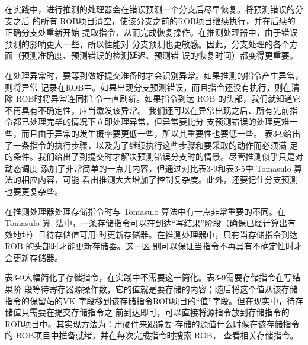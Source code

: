 在实践中，进行推测的处理器会在错误预测一个分支后尽早恢复。将预测错误的分支之后
的所有 ROB项目清空，使该分支之前的ROB项目继续执行，并在后续的正确分支处重新开始
提取指令，从而完成恢复操作。在推测处理器中，由于错误预测的影响更大一些，所以性能对
分支预测也更敏感。因此，分支处理的各个方面（预测准确度、预测错误的检测延迟、预测错
误的恢复时间）都变得更重要。

在处理异常时，要等到做好提交准备时才会识别异常。如果推测的指令产生异常，则将异常
记录在ROB中。如果出现分支预测错误，而且指令还没有执行，则在清除 ROB时将异常连同指
令一直刷新。如果指令到达 ROB 的头部，我们就知道它不再具有不确定性，应当激发该异常。
我们还可以在异常出现之后、所有先前指令都已处理完毕的情况下立即处理异常，但异常要比分
支预测错误的处理更难一些，而且由于异常的发生概率要更低一些，所以其重要性也要低一些。
表3-9给出了一条指令的执行步骤，以及为了继续执行这些步骤和要采取的动作而必须满
足的条件。我们给出了到提交时才解决预测错误分支时的情景。尽管推测似乎只是对动态调度
添加了非常简单的一点儿内容，但通过对比表3-9和表3-5中 Tomasulo 算法的相应内容，可能
看出推测大大增加了控制复杂度。此外，还要记住分支预测也要更复杂些。

在推测处理器处理存储指令时与 Tomasulo 算法中有一点非常重要的不同。在Tomasulo 算.
法中，一条存储指令可以在到达“写结果”阶段（确保已经计算出有效地址）且待存储值可用
时更新存储器。在推测处理器中，只有当存储指令到达ROB 的头部时才能更新存储器。这一区
别可以保证当指令不再具有不确定性时才会更新存储器。

表3-9大幅简化了存储指令，在实践中不需要这一筒化。表3-9需要存储指令在写结果阶
段等待寄存器源操作数，它的值就是要存储的内容；随后将这个值从该存储指令的保留站的VK
字段移到该存储指令ROB项目的“值”字段。但在现实中，待存储值只需要在提交存储指令之
前到达即可，可以直接将源指令放到存储指令的ROB项目中。其实现方法为：用硬件来跟踪要
存储的源值什么时候在该存储指令的 ROB项目中推备就绪，并在每次完成指令时搜索 ROB，
查看相关存储指令。

